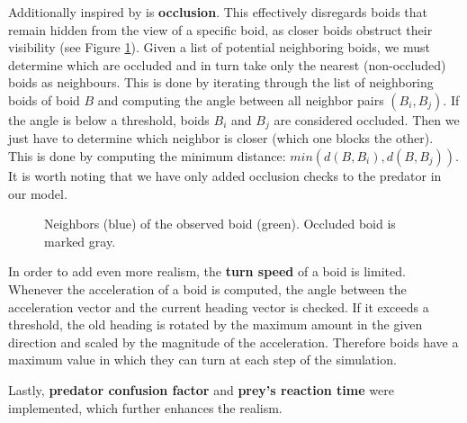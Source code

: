 \documentclass[9pt]{pnas-new}
\begin{document}
Additionally inspired by \cite{JDemsar_predator_attacks} is \textbf{occlusion}.
This effectively disregards boids that remain hidden from the view of a specific boid, as closer
boids obstruct their visibility (see Figure \ref{fig:occlusion}). Given a list of potential neighboring boids,
we must determine which are occluded and in turn take only the nearest (non-occluded) boids as neighbours.
This is done by iterating through the list of neighboring boids of boid $B$ and computing the angle between all
neighbor pairs $(B_i, B_j)$. If the angle is below a threshold, boids $B_i$ and $B_j$ are considered occluded.
Then we just have to determine which neighbor is closer (which one blocks the other). This is done by computing
the minimum distance: $min(d(B, B_i), d(B, B_j))$. It is worth noting that we have only added occlusion
checks to the predator in our model.
\begin{figure}[h]
    \centering
    \caption{Neighbors (blue) of the observed boid (green). Occluded boid is marked gray.}
    \label{fig:occlusion}
\end{figure}

In order to add even more realism, the \textbf{turn speed} of a boid is limited.
Whenever the acceleration of a boid is computed, the angle between the acceleration vector and the current heading vector is checked.
If it exceeds a threshold, the old heading is rotated by the maximum amount in the given direction and scaled by the magnitude of the acceleration.
Therefore boids have a maximum value in which they can turn at each step of the simulation.

Lastly, \textbf{predator confusion factor} and \textbf{prey's reaction time} were implemented, which further enhances the realism.
\end{document}
